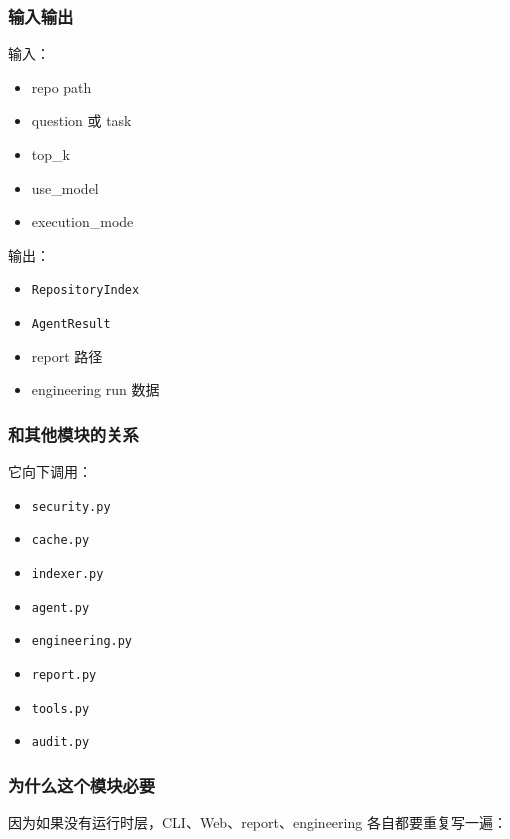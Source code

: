 \documentclass[UTF8,12pt,openany]{ctexbook}
\begin{document}
\subsubsection{输入输出}

输入：\par

\begin{itemize}
\item repo path
\item question 或 task
\item top\_k
\item use\_model
\item execution\_mode
\end{itemize}

输出：\par

\begin{itemize}
\item \texttt{RepositoryIndex}
\item \texttt{AgentResult}
\item report 路径
\item engineering run 数据
\end{itemize}

\subsubsection{和其他模块的关系}

它向下调用：\par

\begin{itemize}
\item \texttt{security.py}
\item \texttt{cache.py}
\item \texttt{indexer.py}
\item \texttt{agent.py}
\item \texttt{engineering.py}
\item \texttt{report.py}
\item \texttt{tools.py}
\item \texttt{audit.py}
\end{itemize}

\subsubsection{为什么这个模块必要}

因为如果没有运行时层，CLI、Web、report、engineering 各自都要重复写一遍：\par
\end{document}
